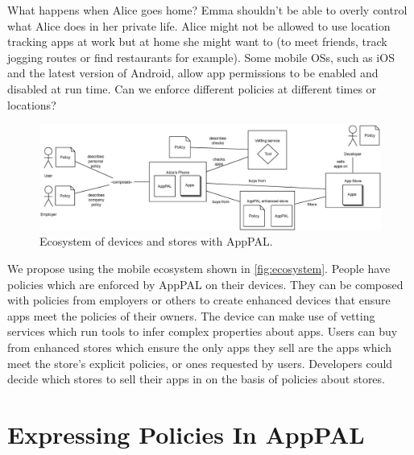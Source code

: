 \documentclass[]{llncs}
\begin{document}
What happens when Alice goes home?
Emma shouldn't be able to overly control what Alice does in her private life.
Alice might not be allowed to use location tracking apps at work but at home she might want to (to meet friends, track jogging routes or find restaurants for example).
Some mobile OSs, such as iOS and the latest version of Android, allow app permissions to be enabled and disabled at run time.
Can we enforce different policies at different times or locations?


\begin{figure}
\includegraphics{figures/overview.eps}
\caption{Ecosystem of devices and stores with AppPAL.}
\label{fig:ecosystem}
\end{figure}

We propose using the mobile ecosystem shown in \autoref{fig:ecosystem}.
People have policies which are enforced by AppPAL on their devices.
They can be composed with policies from employers or others to create enhanced devices that ensure apps meet the policies of their owners.
The device can make use of vetting services which run tools to infer complex properties about apps.
Users can buy from enhanced stores which ensure the only apps they sell are the apps which meet the store's explicit policies, or ones requested by users.
Developers could decide which stores to sell their apps in on the basis of policies about stores.

\section{Expressing Policies In AppPAL}
\label{sec:idea}
\end{document}
